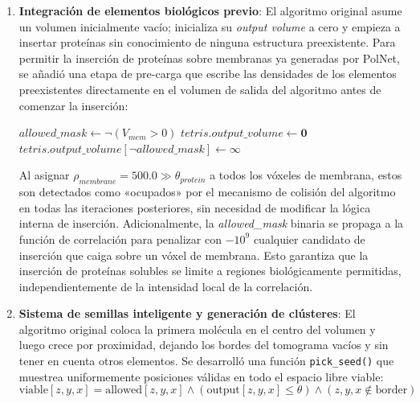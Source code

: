 \begin{enumerate}

     \item \textbf{Integración de elementos biológicos previo}: El algoritmo original asume un volumen inicialmente vacío; inicializa su \textit{output volume} a cero y empieza a insertar proteínas sin conocimiento de ninguna estructura preexistente. Para permitir la inserción de proteínas sobre membranas ya generadas por PolNet, se añadió una etapa de pre-carga que escribe las densidades de los elementos preexistentes directamente en el volumen de salida del algoritmo antes de comenzar la inserción:

    \begin{algorithm}[H]
        \caption{Pre-carga de membrana en el volumen Tetris}
        \label{alg:preload}
        $allowed\_mask \gets \lnot(V_{mem} > 0)$ 
        $tetris.output\_volume \gets \mathbf{0}$ 
        $tetris.output\_volume[\lnot allowed\_mask] \gets \infty$ 
    \end{algorithm}

    Al asignar $\rho_{membrane} = 500.0 \gg \theta_{protein}$ a todos los vóxeles de membrana, estos son detectados como «ocupados» por el mecanismo de colisión del algoritmo en todas las iteraciones posteriores, sin necesidad de modificar la lógica interna de inserción. Adicionalmente, la \textit{allowed\_mask} binaria se propaga a la función de correlación para penalizar con $-10^9$ cualquier candidato de inserción que caiga sobre un vóxel de membrana. Esto garantiza que la inserción de proteínas solubles se limite a regiones biológicamente permitidas, independientemente de la intensidad local de la correlación.

    \item \textbf{Sistema de semillas inteligente y generación de clústeres}: El algoritmo original coloca la primera molécula en el centro del volumen y luego crece por proximidad, dejando los bordes del tomograma vacíos y sin tener en cuenta otros elementos. Se desarrolló una función \texttt{pick\_seed()} que muestrea uniformemente posiciones válidas en todo el espacio libre viable:
    \begin{equation}
    \text{viable}[z, y, x] = \text{allowed}[z, y, x] \land (\text{output}[z, y, x] \leq \theta) \land (z, y, x \notin \text{border})
    \end{equation}


\end{enumerate}
